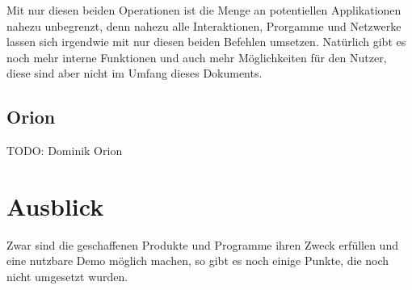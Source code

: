 \documentclass[11pt]{article}
\begin{document}
Mit nur diesen beiden Operationen ist die Menge an potentiellen
Applikationen nahezu unbegrenzt, denn nahezu alle Interaktionen,
Prorgamme und Netzwerke lassen sich irgendwie mit nur diesen beiden
Befehlen umsetzen. Natürlich gibt es noch mehr interne Funktionen und
auch mehr Möglichkeiten für den Nutzer, diese sind aber nicht im
Umfang dieses Dokuments.
\subsection{Orion}
\label{sec:orgdd542da}
TODO: Dominik Orion
\section{Ausblick}
\label{sec:org2c7b306}
Zwar sind die geschaffenen Produkte und Programme ihren Zweck erfüllen
und eine nutzbare Demo möglich machen, so gibt es noch einige Punkte,
die noch nicht umgesetzt wurden.
\end{document}
